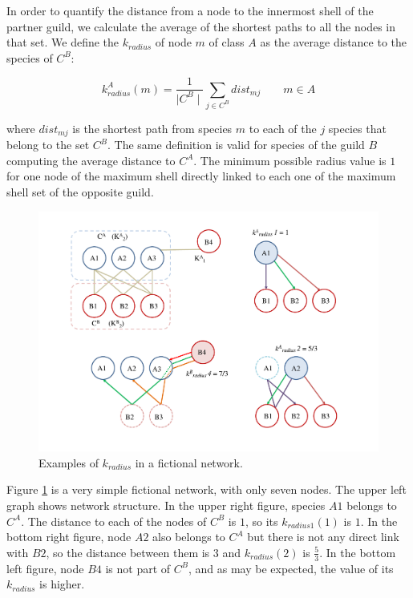 \documentclass[11pt]{article}
\begin{document}
In order to quantify the distance from a node to the innermost shell of the partner guild, we calculate the average of the shortest paths to all the nodes in that set. We define the \textit{$k_{radius}$} of node $m$ of class $A$ as the average distance to the species of $C^B$:

\begin{equation}
\displaystyle
k^A_{radius}(m) = \frac{1}{\mid C^{B} \mid}\sum\limits_{j \in C^{B}} dist_{mj}  \qquad   m \in A
\label{kradius}
\end{equation}

\noindent where $dist_{mj}$ is the shortest path from species $m$ to each of the $j$ species that belong to the set $C^B$. The same definition is valid for species of the guild $B$ computing the average distance to $C^A$. The minimum possible radius value is $1$ for one node of the maximum shell directly linked to each one of the maximum shell set of the opposite guild.

\begin{figure}[h!]
\centering
\includegraphics[scale=0.45]{red_example.pdf}
\caption {Examples of \textit{$k_{radius}$} in a fictional network.}
\label{fig:KMAN_red_example}
\end{figure}

Figure \ref{fig:KMAN_red_example} is a very simple fictional network, with only seven nodes. The upper left graph shows network structure. In the upper right figure, species $A1$ belongs to $C^{A}$.  The distance to each of the nodes of $C^{B}$ is $1$, so its \textit{$k_{radius1}(1)$} is $1$. In the bottom right figure, node  $A2$ also belongs to $C^{A}$ but there is not any direct link with $B2$, so the distance between them is $3$ and \textit{$k_{radius}(2)$} is $\frac{5}{3}$. In the bottom left figure, node $B4$ is not part of $C^{B}$, and as may be expected, the value of its \textit{$k_{radius}$} is higher. 
\end{document}
